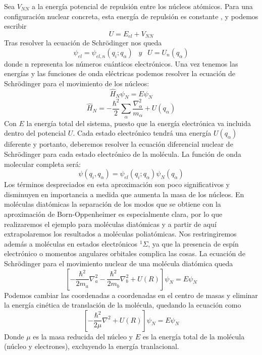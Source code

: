 \documentclass[a4paper]{article}
\begin{document}
Sea $V_{NN}$ a la energía potencial de repulsión entre los núcleos atómicos. Para una configuración nuclear concreta, esta energía de repulsión es constante , y podemos escribir 
\begin{equation}
U=E_{el}+V_{NN}
\end{equation}
Tras resolver la ecuación de Schrödinger nos queda 
\begin{equation}
\psi_{el}=\psi_{el,n}(q_i;q_\alpha)\,\ \,\ y \,\ \,\ U=U_n(q_\alpha)
\end{equation}
donde n representa los números cuánticos electrónicos.
Una vez tenemos las energías y las funciones de onda eléctricas podemos resolver la ecuación de Schrödinger para el movimiento de los núcleos:
\begin{equation}
\hat H_N\psi_N=E\psi_N
\end{equation}
\begin{equation}
\hat H_N=-\frac{\hbar^2}{2}\sum_\alpha \frac{\nabla^2_\alpha}{m_\alpha}+U(q_\alpha)
\end{equation}
Con $E$ la energía total del sistema, puesto que la energía electrónica va incluida dentro del potencial $U$. Cada estado electrónico tendrá una energía $U(q_\alpha)$ diferente y portanto, deberemos resolver la ecuación diferencial nuclear de Schrödinger para cada estado electrónico de la molécula.
La función de onda molecular completa será:
\begin{equation}
\psi(q_i,q_\alpha )=\psi_{el}(q_i;q_\alpha )\psi_N(q_\alpha )
\end{equation}
Los términos despreciados en esta aproximación son poco significativos y disminuyen en importancia a medida que aumenta la masa de los núcleos.
En moléculas diatómicas la separación de los modos que se obtiene con la aproximación de Born-Oppenheimer es especialmente clara, por lo que realizaremos el ejemplo para moléculas diatómicas y a partir de aquí extrapolaremos los resultados a moléculas poliatómicas. Nos restringiremos además a moléculas en estados electrónicos $^1\Sigma$, ya que la presencia de espín electrónico o momentos angulares orbitales complica las cosas.
La ecuación de Schrödinger para el movimiento nuclear de una molécula diatómica queda
\begin{equation}
\left[-\frac{\hbar^2}{2m_a}\nabla^2_a-\frac{\hbar^2}{2m_b}\nabla^2_b+U(R)\right]\psi_N=E\psi_N
\end{equation}
Podemos cambiar las coordenadas a coordenadas en el centro de masas y eliminar la energía cinética de translación de la molécula, quedando la ecuación como
\begin{equation}
\left[-\frac{\hbar^2}{2\mu}\nabla^2+U(R)\right]\psi_N=E\psi_N
\end{equation}
Donde $\mu$ es la masa reducida del núcleo y $E$ es la energía total de la molécula (núcleo y electrones), excluyendo la energía tranlacional.\\
\end{document}
